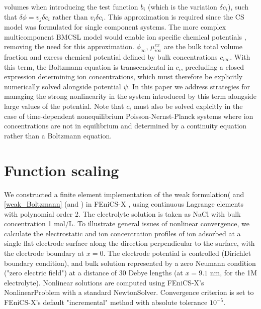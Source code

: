 volumes when introducing the test function $b_i$ (which is the
variation $\delta c_i$), such that $\delta\phi=v_j \delta c_i$ rather
than $v_i \delta c_i$. This approximation is required since the CS
model was formulated for single component systems. The more complex
multicomponent BMCSL model would enable ion specific chemical
potentials \cite{MansooriCarnahanStarlingLeland1971}, removing the
need for this approximation.  $\phi_{\infty}$, $\mu_{i\infty}^{ex}$
are the bulk total volume fraction and excess chemical potential
defined by bulk concentrations $c_{i\infty}$. With this term, the
Boltzmann equation is transcendental in $c_i$, precluding a closed
expression determining ion concentrations, which must therefore be
explicitly numerically solved alongside potential $\psi$. In this
paper we address strategies for managing the strong nonlinearity in
the system introduced by this term alongside large values of the
potential. Note that $c_i$ must also be solved explcitly in the case
of time-dependent nonequilibrium Poisson-Nernst-Planck systems where
ion concentrations are not in equilibrium and determined by a
continuity equation rather than a Boltzmann equation.

\section{Function scaling}
We constructed a finite element implementation of the weak
formulation( and \ref{weak_Boltzmann} (and
) in FEniCS-X \cite{baratta2023dolfinx}, using continuous
Lagrange elements with polynomial order 2.  The electrolyte solution
is taken as NaCl with bulk concentration 1 mol/L.  To illustrate
general issues of nonlinear convergence, we calculate the
electrostatic and ion concentration profiles of ion adsorbed at a
single flat electrode surface along the direction perpendicular to the
surface, with the electrode boundary at $x=0$.  The electrode
potential is controlled (Dirichlet boundary condition), and bulk
solution represented by a zero Neumann condition ("zero electric
field") at a distance of 30 Debye lengths (at $x=9.1$ nm, for the 1M
electrolyte). Nonlinear solutions are computed using FEniCS-X's
NonlinearProblem with a standard NewtonSolver. Convergence criterion
is set to FEniCS-X's default "incremental" method with absolute
tolerance $10^{-5}$.

